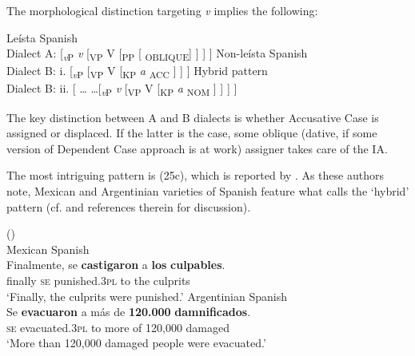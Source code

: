 \documentclass[output=paper]{langsci/langscibook}
\begin{document}
The morphological distinction targeting \textit{v} implies the following:

\ea%
    \label{ex:gallego:25}
    \ea Leísta Spanish\\
     Dialect A:   [\textit{\textsubscript{v}}\textsubscript{P} \textit{v} [\textsubscript{VP} V  [\textsubscript{PP}    [ \textsubscript{OBLIQUE}] ] ] ] 
    \ex Non-leísta Spanish\\
    Dialect B:  i.  [\textit{\textsubscript{v}}\textsubscript{P}  [\textsubscript{VP} V [\textsubscript{KP} \textit{a} \textsubscript{ACC} ] ] ]
    \ex Hybrid pattern\\
    Dialect B:  ii.   [ \ldots\xspace {} \ldots\xspace [\textit{\textsubscript{v}}\textsubscript{P} \textit{v} [\textsubscript{VP} V [\textsubscript{KP} \textit{a} \textsubscript{NOM} ] ] ] ]
    \z
\z    



The key distinction between A and B dialects is whether Accusative Case is assigned or displaced. If the latter is the case, some oblique (dative, if some version of  Dependent Case approach is at work) assigner takes care of the IA.

The most intriguing pattern is (25c), which is reported by \citet{Ordóñez2007}. As these authors note, Mexican and Argentinian varieties of Spanish feature what \citet{RAE-ASALE2009} calls the ‘hybrid’ pattern (cf. \citealt{Planells2017} and references therein for discussion).

\ea%
    (\citealt[12]{Ordóñez2007})\\
    \ea Mexican Spanish\label{ex:gallego:26}\\
    \gll Finalmente, se  \textbf{castigaron}       a  \textbf{los} \textbf{culpables}.        \\
         finally         \textsc{se}   punished.\textsc{3pl}   to the culprits\\
    \glt ‘Finally, the culprits were punished.’
    \ex Argentinian Spanish\\
    \gll Se  \textbf{evacuaron}    a más de \textbf{120.000} \textbf{damnificados}.              \\
         \textsc{se}   evacuated.\textsc{3pl} to more of 120,000 damaged\\
    \glt  ‘More than 120,000 damaged people were evacuated.’
    \z
\z
\end{document}
